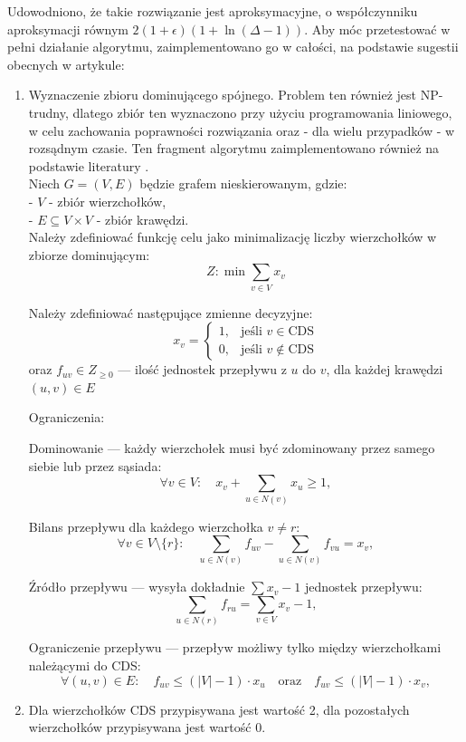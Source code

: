 Udowodniono, że takie rozwiązanie jest aproksymacyjne, o współczynniku aproksymacji równym
$2(1+\epsilon)(1 + \ln(\Delta - 1))$. Aby móc przetestować w pełni działanie algorytmu, zaimplementowano go w całości, na podstawie sugestii obecnych w artykule:

\begin{enumerate}
    \item Wyznaczenie zbioru dominującego spójnego. Problem ten również jest NP-trudny, dlatego zbiór ten wyznaczono przy użyciu programowania liniowego, w celu zachowania poprawności rozwiązania oraz - dla wielu przypadków - w rozsądnym czasie. Ten fragment algorytmu zaimplementowano również na podstawie literatury \cite{CDS}.\\ 
    Niech \( G = (V, E) \) będzie grafem nieskierowanym, gdzie:\\
        - \( V \) - zbiór wierzchołków,\\
        - \( E \subseteq V \times V \) - zbiór krawędzi.\\

        Należy zdefiniować funkcję celu jako minimalizację liczby wierzchołków w zbiorze dominującym:
        \[
        Z: \min \sum_{v \in V} x_v
        \]

        Należy zdefiniować następujące zmienne decyzyjne:
        \[
        x_v =
        \begin{cases}
        1, & \text{jeśli } v \in \text{CDS} \\
        0, & \text{jeśli } v \notin \text{CDS}
        \end{cases}
        \]
        oraz \( f_{uv} \in {Z}_{\geq 0} \) — ilość jednostek przepływu z \( u \) do \( v \), dla każdej krawędzi \( (u, v) \in E \)

        Ograniczenia:

        Dominowanie — każdy wierzchołek musi być zdominowany przez samego siebie lub przez sąsiada:
        \[
        \forall v \in V:\quad x_v + \sum_{u \in N(v)} x_u \geq 1, \tag{1}
        \]

        Bilans przepływu dla każdego wierzchołka \( v \neq r \):
        \[
        \forall v \in V \setminus \{r\}:\quad \sum_{u \in N(v)} f_{uv} - \sum_{u \in N(v)} f_{vu} = x_v, \tag{2}
        \]

        Źródło przepływu — wysyła dokładnie \( \sum x_v - 1 \) jednostek przepływu:
        \[
        \sum_{u \in N(r)} f_{ru} = \sum_{v \in V} x_v - 1, \tag{3}
        \]

        Ograniczenie przepływu — przepływ możliwy tylko między wierzchołkami należącymi do CDS:
        \[
        \forall (u, v) \in E:\quad f_{uv} \leq (|V| - 1) \cdot x_u \quad \text{oraz} \quad f_{uv} \leq (|V| - 1) \cdot x_v, \tag{4}
        \]
    \item Dla wierzchołków CDS przypisywana jest wartość 2, dla pozostałych wierzchołków przypisywana jest wartość 0.
\end{enumerate}

